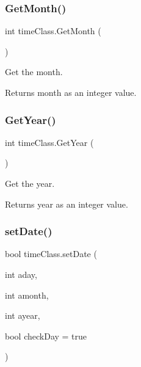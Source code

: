 \subsubsection{\texorpdfstring{GetMonth()}{GetMonth()}}
{\footnotesize\ttfamily int time\+Class.\+Get\+Month (\begin{DoxyParamCaption}{ }\end{DoxyParamCaption})\hspace{0.3cm}{\ttfamily [inline]}}



Get the month. 

\begin{DoxyReturn}{Returns}
month as an integer value. 
\end{DoxyReturn}
\mbox{\label{classtime_class_afe3b5cacaca30b738a82ceea12d9afda}} 
\subsubsection{\texorpdfstring{GetYear()}{GetYear()}}
{\footnotesize\ttfamily int time\+Class.\+Get\+Year (\begin{DoxyParamCaption}{ }\end{DoxyParamCaption})\hspace{0.3cm}{\ttfamily [inline]}}



Get the year. 

\begin{DoxyReturn}{Returns}
year as an integer value. 
\end{DoxyReturn}
\mbox{\label{classtime_class_a2549ae2d02d6ef32bb0afb19d5ddd45d}} 
\subsubsection{\texorpdfstring{setDate()}{setDate()}}
{\footnotesize\ttfamily bool time\+Class.\+set\+Date (\begin{DoxyParamCaption}\item[{int}]{aday,  }\item[{int}]{amonth,  }\item[{int}]{ayear,  }\item[{bool}]{check\+Day = {\ttfamily true} }\end{DoxyParamCaption})\hspace{0.3cm}{\ttfamily [inline]}}



